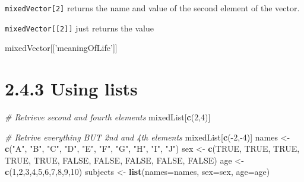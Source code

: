 \documentclass[a4paper]{book}
\newenvironment{Shaded}{\begin{snugshade}}{\end{snugshade}}
\newcommand{\KeywordTok}[1]{\textcolor[rgb]{0.13,0.29,0.53}{\textbf{{#1}}}}
\newcommand{\DataTypeTok}[1]{\textcolor[rgb]{0.13,0.29,0.53}{{#1}}}
\newcommand{\DecValTok}[1]{\textcolor[rgb]{0.00,0.00,0.81}{{#1}}}
\newcommand{\StringTok}[1]{\textcolor[rgb]{0.31,0.60,0.02}{{#1}}}
\newcommand{\CommentTok}[1]{\textcolor[rgb]{0.56,0.35,0.01}{\textit{{#1}}}}
\newcommand{\OtherTok}[1]{\textcolor[rgb]{0.56,0.35,0.01}{{#1}}}
\newcommand{\NormalTok}[1]{{#1}}
\renewenvironment{Shaded}
{\vspace{1.5em}\begin{leftbar}\begin{snugshade}}
{\end{snugshade}\end{leftbar}\vspace{3pt}}
\begin{document}
\texttt{mixedVector{[}2{]}} returns the name and value of the second
element of the vector.

\texttt{mixedVector{[}{[}2{]}{]}} just returns the value

\begin{Shaded}
\begin{Highlighting}[]
\NormalTok{mixedVector[[}\StringTok{'meaningOfLife'}\NormalTok{]]}
\end{Highlighting}
\end{Shaded}

\section*{2.4.3 Using lists}\label{using-lists}

\begin{Shaded}
\begin{Highlighting}[]
\CommentTok{# Retrieve second and fourth elements}
\NormalTok{mixedList[}\KeywordTok{c}\NormalTok{(}\DecValTok{2}\NormalTok{,}\DecValTok{4}\NormalTok{)]}

\CommentTok{# Retrive everything BUT 2nd and 4th elements}
\NormalTok{mixedList[}\KeywordTok{c}\NormalTok{(-}\DecValTok{2}\NormalTok{,-}\DecValTok{4}\NormalTok{)]}
\NormalTok{names <-}\StringTok{ }\KeywordTok{c}\NormalTok{(}\StringTok{"A"}\NormalTok{, }\StringTok{"B"}\NormalTok{, }\StringTok{"C"}\NormalTok{, }\StringTok{"D"}\NormalTok{, }\StringTok{"E"}\NormalTok{, }\StringTok{"F"}\NormalTok{, }\StringTok{"G"}\NormalTok{, }\StringTok{"H"}\NormalTok{, }\StringTok{"I"}\NormalTok{, }\StringTok{"J"}\NormalTok{)}
\NormalTok{sex <-}\StringTok{ }\KeywordTok{c}\NormalTok{(}\OtherTok{TRUE}\NormalTok{, }\OtherTok{TRUE}\NormalTok{, }\OtherTok{TRUE}\NormalTok{, }\OtherTok{TRUE}\NormalTok{, }\OtherTok{TRUE}\NormalTok{, }\OtherTok{FALSE}\NormalTok{, }\OtherTok{FALSE}\NormalTok{, }\OtherTok{FALSE}\NormalTok{, }\OtherTok{FALSE}\NormalTok{, }\OtherTok{FALSE}\NormalTok{)}
\NormalTok{age <-}\StringTok{ }\KeywordTok{c}\NormalTok{(}\DecValTok{1}\NormalTok{,}\DecValTok{2}\NormalTok{,}\DecValTok{3}\NormalTok{,}\DecValTok{4}\NormalTok{,}\DecValTok{5}\NormalTok{,}\DecValTok{6}\NormalTok{,}\DecValTok{7}\NormalTok{,}\DecValTok{8}\NormalTok{,}\DecValTok{9}\NormalTok{,}\DecValTok{10}\NormalTok{)}
\NormalTok{subjects <-}\StringTok{ }\KeywordTok{list}\NormalTok{(}\DataTypeTok{names=}\NormalTok{names, }\DataTypeTok{sex=}\NormalTok{sex, }\DataTypeTok{age=}\NormalTok{age)}
\end{Highlighting}
\end{Shaded}
\end{document}
